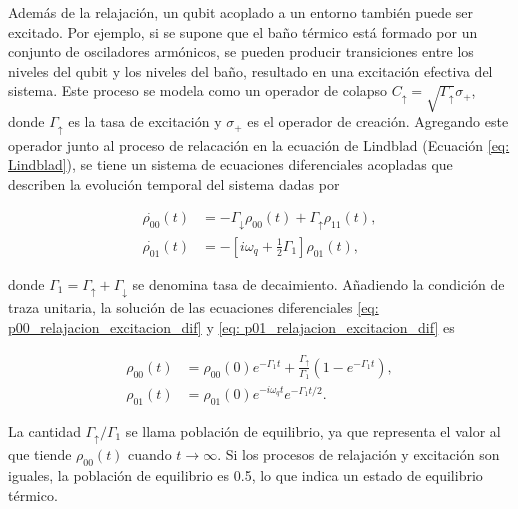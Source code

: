Además de la relajación, un qubit acoplado a un entorno también puede ser excitado. Por ejemplo, si se supone que el baño térmico está formado por un conjunto de osciladores armónicos, se pueden producir transiciones entre los niveles del qubit y los niveles del baño, resultado en una excitación efectiva del sistema. Este proceso se modela como un operador de colapso \(C_\uparrow = \sqrt{\Gamma_\uparrow} \sigma_+\), donde \(\Gamma_\uparrow\) es la tasa de excitación y \(\sigma_+\) es el operador de creación. Agregando este operador junto al proceso de relacación en la ecuación de Lindblad (Ecuación \ref{eq: Lindblad}), se tiene un sistema de ecuaciones diferenciales acopladas que describen la evolución temporal del sistema dadas por

\begin{align}
    \dot{\rho_{00}}(t) &= -\Gamma_\downarrow \rho_{00}(t) + \Gamma_\uparrow \rho_{11}(t), \label{eq: p00_relajacion_excitacion_dif} \\
    \dot{\rho_{01}}(t) &= -\left[i \omega_q + \frac{1}{2}\Gamma_1 \right] \rho_{01}(t), \label{eq: p01_relajacion_excitacion_dif}
\end{align}

\noindent donde \(\Gamma_1 = \Gamma_\uparrow + \Gamma_\downarrow\) se denomina tasa de decaimiento. Añadiendo la condición de traza unitaria, la solución de las ecuaciones diferenciales \ref{eq: p00_relajacion_excitacion_dif} y \ref{eq: p01_relajacion_excitacion_dif} es

\begin{align}
    \rho_{00}(t) &= \rho_{00}(0) e^{-\Gamma_1 t} + \frac{\Gamma_\uparrow}{\Gamma_1} \left(1 - e^{-\Gamma_1 t} \right), \label{eq: p00_relajacion_excitacion_sol} \\
    \rho_{01}(t) &= \rho_{01}(0) e^{-i \omega_q t} e^{-\Gamma_1 t / 2} \label{eq: p01_relajacion_excitacion_sol}.
\end{align}


La cantidad \(\Gamma_\uparrow/\Gamma_1\) se llama población de equilibrio, ya que representa el valor al que tiende \(\rho_{00}(t)\) cuando \(t \rightarrow \infty\). Si los procesos de relajación y excitación son iguales, la población de equilibrio es 0.5, lo que indica un estado de equilibrio térmico. 

